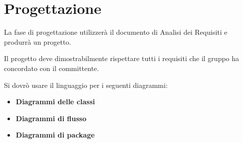 \section{Progettazione}

La fase di progettazione utilizzerà il documento di Analisi dei Requisiti e produrrà un progetto.

Il progetto deve dimostrabilmente rispettare tutti i requisiti che il gruppo ha concordato con il committente.

Si dovrò usare il linguaggio  per i seguenti diagrammi:
\begin{itemize}
 \item \textbf{Diagrammi delle classi} %
 \item \textbf{Diagrammi di flusso} %
 \item \textbf{Diagrammi di package} %
\end{itemize}


